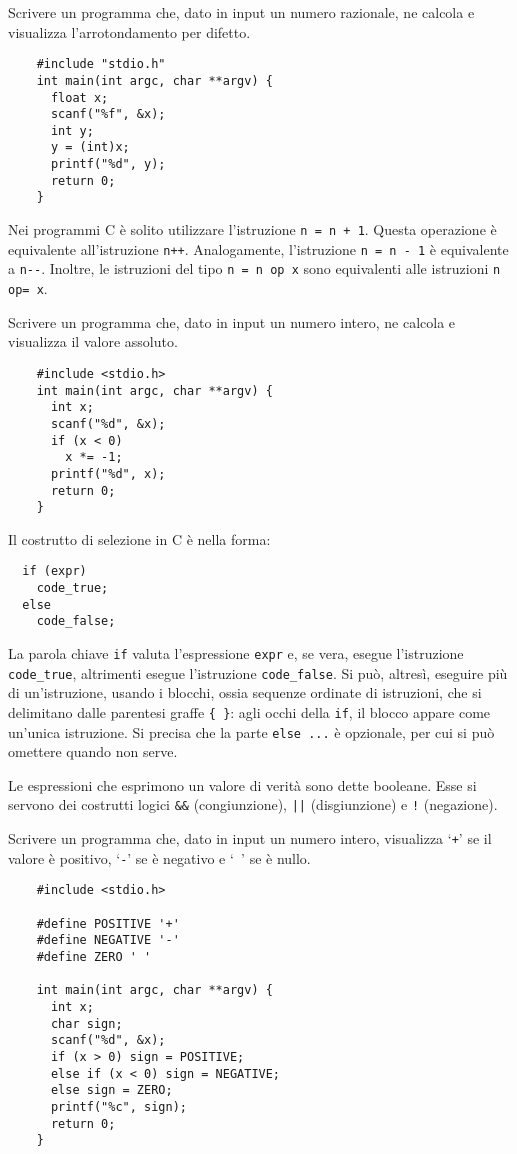 \begin{example}
  Scrivere un programma che, dato in input un numero razionale, ne calcola e visualizza l'arrotondamento per difetto.
  \begin{verbatim}
    #include "stdio.h"
    int main(int argc, char **argv) {
      float x;
      scanf("%f", &x);
      int y;
      y = (int)x;
      printf("%d", y);
      return 0;
    }\end{verbatim}
\end{example}

Nei programmi C è solito utilizzare l'istruzione \verb|n = n + 1|. Questa operazione è equivalente all'istruzione \verb|n++|. Analogamente, l'istruzione \verb|n = n - 1| è equivalente a \verb|n--|.
Inoltre, le istruzioni del tipo \verb|n = n op x| sono equivalenti alle istruzioni \verb|n op= x|.

\begin{example}
  Scrivere un programma che, dato in input un numero intero, ne calcola e visualizza il valore assoluto.
  \begin{verbatim}
    #include <stdio.h>
    int main(int argc, char **argv) {
      int x;
      scanf("%d", &x);
      if (x < 0) 
        x *= -1;
      printf("%d", x);
      return 0;
    }\end{verbatim}
\end{example}

Il costrutto di selezione in C è nella forma:
\begin{verbatim}
  if (expr)
    code_true;
  else
    code_false;
\end{verbatim}

La parola chiave \verb|if| valuta l'espressione \verb|expr| e, se vera, esegue l'istruzione \verb|code_true|, altrimenti esegue l'istruzione \verb|code_false|.
Si può, altresì, eseguire più di un'istruzione, usando i blocchi, ossia sequenze ordinate di istruzioni, che si delimitano dalle parentesi graffe \verb|{ }|: agli occhi della \verb|if|, il blocco appare come un'unica istruzione.
Si precisa che la parte \verb|else ...| è opzionale, per cui si può omettere quando non serve.

Le espressioni che esprimono un valore di verità sono dette booleane. Esse si servono dei costrutti logici \verb|&&| (congiunzione), \verb!||! (disgiunzione) e \verb|!| (negazione).

\begin{example}
  Scrivere un programma che, dato in input un numero intero, visualizza `\verb|+|' se il valore è positivo, `\verb|-|' se è negativo e `\verb| |' se è nullo.
  \begin{verbatim}
    #include <stdio.h>

    #define POSITIVE '+'
    #define NEGATIVE '-'
    #define ZERO ' '

    int main(int argc, char **argv) {
      int x;
      char sign;
      scanf("%d", &x);
      if (x > 0) sign = POSITIVE;
      else if (x < 0) sign = NEGATIVE;
      else sign = ZERO;
      printf("%c", sign);
      return 0;
    }\end{verbatim}
\end{example}

